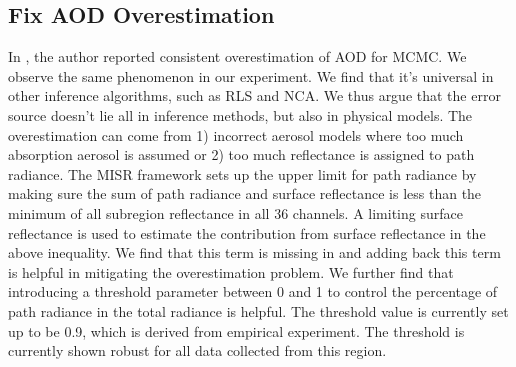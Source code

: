 \subsection{Fix AOD Overestimation}
In \cite{taesup}, the author reported consistent overestimation of AOD for MCMC. We observe the same phenomenon in our experiment. We find that it's universal in other inference algorithms, such as RLS and NCA. We thus argue that the error source doesn't lie all in inference methods, but also in physical models. The overestimation can come from 1) incorrect aerosol models where too much absorption aerosol is assumed or 2) too much reflectance is assigned to path radiance. The MISR framework sets up the upper limit for path radiance by making sure the sum of path radiance and surface reflectance is less than the minimum of all subregion reflectance in all 36 channels. A limiting surface reflectance is used to estimate the contribution from surface reflectance in the above inequality. We find that this term is missing in \cite{nancy_paper} \cite{taesup}  and adding back this term is helpful in mitigating the overestimation problem. We further find that introducing a threshold parameter between 0 and 1 to control the percentage of path radiance in the total radiance is helpful. The threshold value is currently set up to be 0.9, which is derived from empirical experiment. The threshold is currently shown robust for all data collected from this region.
\label{overestimate}
